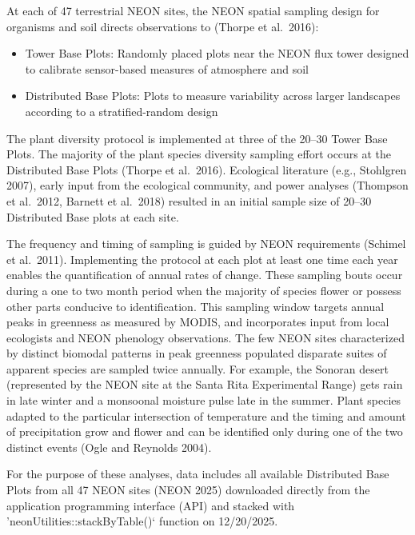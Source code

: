 \documentclass[
  11pt,
]{article}
\providecommand{\tightlist}{%
  \setlength{\itemsep}{0pt}\setlength{\parskip}{0pt}}
\begin{document}
At each of 47 terrestrial NEON sites, the NEON spatial sampling design
for organisms and soil directs observations to (Thorpe et al.~2016):

\begin{itemize}
\tightlist
\item
  Tower Base Plots: Randomly placed plots near the NEON flux tower
  designed to calibrate sensor-based measures of atmosphere and soil\\
\item
  Distributed Base Plots: Plots to measure variability across larger
  landscapes according to a stratified-random design
\end{itemize}

The plant diversity protocol is implemented at three of the 20--30 Tower
Base Plots. The majority of the plant species diversity sampling effort
occurs at the Distributed Base Plots (Thorpe et al.~2016). Ecological
literature (e.g., Stohlgren 2007), early input from the ecological
community, and power analyses (Thompson et al.~2012, Barnett et
al.~2018) resulted in an initial sample size of 20--30 Distributed Base
plots at each site.

The frequency and timing of sampling is guided by NEON requirements
(Schimel et al.~2011). Implementing the protocol at each plot at least
one time each year enables the quantification of annual rates of change.
These sampling bouts occur during a one to two month period when the
majority of species flower or possess other parts conducive to
identification. This sampling window targets annual peaks in greenness
as measured by MODIS, and incorporates input from local ecologists and
NEON phenology observations. The few NEON sites characterized by
distinct biomodal patterns in peak greenness populated disparate suites
of apparent species are sampled twice annually. For example, the Sonoran
desert (represented by the NEON site at the Santa Rita Experimental
Range) gets rain in late winter and a monsoonal moisture pulse late in
the summer. Plant species adapted to the particular intersection of
temperature and the timing and amount of precipitation grow and flower
and can be identified only during one of the two distinct events (Ogle
and Reynolds 2004).

For the purpose of these analyses, data includes all available
Distributed Base Plots from all 47 NEON sites (NEON 2025) downloaded
directly from the application programming interface (API) and stacked
with 'neonUtilities::stackByTable()` function on 12/20/2025.
\end{document}

